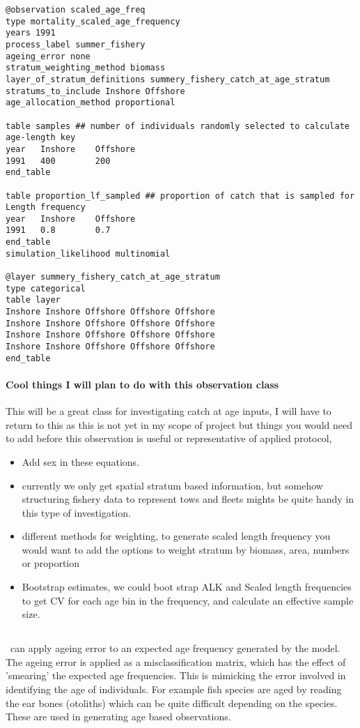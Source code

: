 {\small{\begin{verbatim}
@observation scaled_age_freq
type mortality_scaled_age_frequency
years 1991
process_label summer_fishery
ageing_error none
stratum_weighting_method biomass
layer_of_stratum_definitions summery_fishery_catch_at_age_stratum
stratums_to_include Inshore Offshore
age_allocation_method proportional

table samples ## number of individuals randomly selected to calculate age-length key
year   Inshore    Offshore
1991   400        200
end_table

table proportion_lf_sampled ## proportion of catch that is sampled for Length frequency
year   Inshore    Offshore
1991   0.8        0.7
end_table
simulation_likelihood multinomial

@layer summery_fishery_catch_at_age_stratum
type categorical
table layer 
Inshore Inshore Offshore Offshore Offshore
Inshore Inshore Offshore Offshore Offshore
Inshore Inshore Offshore Offshore Offshore
Inshore Inshore Offshore Offshore Offshore
end_table
\end{verbatim}}}


\paragraph*{Cool things I will plan to do with this observation class}
This will be a great class for investigating catch at age inputs, I will have to return to this as this is not yet in my scope of project but things you would need to add before this observation is useful or representative of applied protocol,

\begin{itemize}
	\item Add sex in these equations.
	\item currently we only get spatial stratum based information, but somehow structuring fishery data to represent tows and fleets mights be quite handy in this type of investigation.
	\item different methods for weighting, to generate scaled length frequency you would want to add the options to weight stratum by biomass, area, numbers or proportion
	\item Bootstrap estimates, we could boot strap ALK and Scaled length frequencies to get CV for each age bin in the frequency, and calculate an effective sample size.
\end{itemize}



\subsection{}\label{subsec:ageing_error}
\IBM\ can apply ageing error to an expected age frequency generated by the model. The ageing error is applied as a misclassification matrix, which has the effect of 'smearing' the expected age frequencies. This is mimicking the error involved in identifying the age of individuals. For example fish species are aged by reading the ear bones (otoliths) which can be quite difficult depending on the species. These are used in generating age based observations. 

